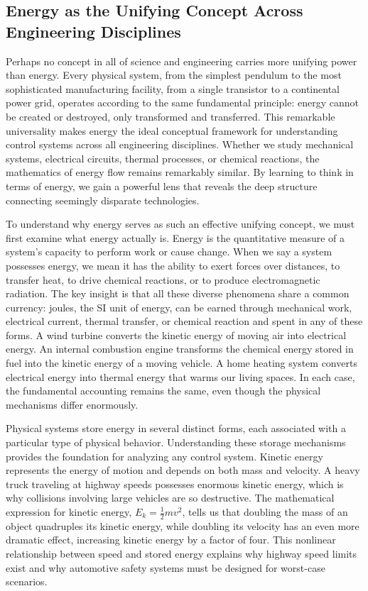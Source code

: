 \subsection{Energy as the Unifying Concept Across Engineering Disciplines}

Perhaps no concept in all of science and engineering carries more unifying power than energy. Every physical system, from the simplest pendulum to the most sophisticated manufacturing facility, from a single transistor to a continental power grid, operates according to the same fundamental principle: energy cannot be created or destroyed, only transformed and transferred. This remarkable universality makes energy the ideal conceptual framework for understanding control systems across all engineering disciplines. Whether we study mechanical systems, electrical circuits, thermal processes, or chemical reactions, the mathematics of energy flow remains remarkably similar. By learning to think in terms of energy, we gain a powerful lens that reveals the deep structure connecting seemingly disparate technologies.

To understand why energy serves as such an effective unifying concept, we must first examine what energy actually is. Energy is the quantitative measure of a system's capacity to perform work or cause change. When we say a system possesses energy, we mean it has the ability to exert forces over distances, to transfer heat, to drive chemical reactions, or to produce electromagnetic radiation. The key insight is that all these diverse phenomena share a common currency: joules, the SI unit of energy, can be earned through mechanical work, electrical current, thermal transfer, or chemical reaction and spent in any of these forms. A wind turbine converts the kinetic energy of moving air into electrical energy. An internal combustion engine transforms the chemical energy stored in fuel into the kinetic energy of a moving vehicle. A home heating system converts electrical energy into thermal energy that warms our living spaces. In each case, the fundamental accounting remains the same, even though the physical mechanisms differ enormously.

Physical systems store energy in several distinct forms, each associated with a particular type of physical behavior. Understanding these storage mechanisms provides the foundation for analyzing any control system. Kinetic energy represents the energy of motion and depends on both mass and velocity. A heavy truck traveling at highway speeds possesses enormous kinetic energy, which is why collisions involving large vehicles are so destructive. The mathematical expression for kinetic energy, $E_k = \frac{1}{2}mv^2$, tells us that doubling the mass of an object quadruples its kinetic energy, while doubling its velocity has an even more dramatic effect, increasing kinetic energy by a factor of four. This nonlinear relationship between speed and stored energy explains why highway speed limits exist and why automotive safety systems must be designed for worst-case scenarios.

